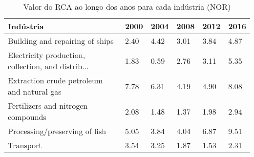 \begin{table}
\centering
\caption{Valor do RCA ao longo dos anos para cada indústria (NOR)}
\label{tab:ex3-tempo-NOR}
\begin{tabular}{p{6cm}p{1.5cm}p{1.5cm}p{1.5cm}p{1.5cm}p{1.5cm}}
\toprule
                                         Indústria & 2000 & 2004 & 2008 & 2012 & 2016 \\
\midrule
                   Building and repairing of ships & 2.40 & 4.42 & 3.01 & 3.84 & 4.87 \\
Electricity production, collection, and distrib... & 1.83 & 0.59 & 2.76 & 3.11 & 5.35 \\
        Extraction crude petroleum and natural gas & 7.78 & 6.31 & 4.19 & 4.90 & 8.08 \\
                Fertilizers and nitrogen compounds & 2.08 & 1.48 & 1.37 & 1.98 & 2.94 \\
                     Processing/preserving of fish & 5.05 & 3.84 & 4.04 & 6.87 & 9.51 \\
                                         Transport & 3.54 & 3.25 & 1.87 & 1.53 & 2.31 \\
\bottomrule
\end{tabular}
\end{table}
